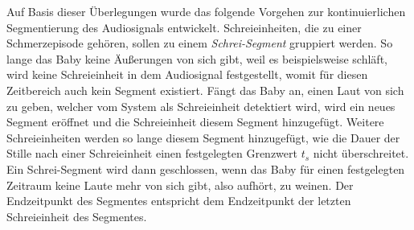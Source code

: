 

Auf Basis dieser Überlegungen wurde das folgende Vorgehen zur kontinuierlichen Segmentierung des Audiosignals entwickelt. Schreieinheiten, die zu einer Schmerzepisode gehören, sollen zu einem \emph{Schrei-Segment} gruppiert werden. So lange das Baby keine Äußerungen von sich gibt, weil es beispielsweise schläft, wird keine Schreieinheit in dem Audiosignal festgestellt, womit für diesen Zeitbereich auch kein Segment existiert. Fängt das Baby an, einen Laut von sich zu geben, welcher vom System als Schreieinheit detektiert wird, wird ein neues Segment eröffnet und die Schreieinheit diesem Segment hinzugefügt. Weitere Schreieinheiten werden so lange diesem Segment hinzugefügt, wie die Dauer der Stille nach einer Schreieinheit einen festgelegten Grenzwert $t_{s}$ nicht überschreitet. Ein Schrei-Segment wird dann geschlossen, wenn das Baby für einen festgelegten Zeitraum keine Laute mehr von sich gibt, also \glqq aufhört, zu weinen\grqq{}. Der Endzeitpunkt des Segmentes entspricht dem Endzeitpunkt der letzten Schreieinheit des Segmentes.

